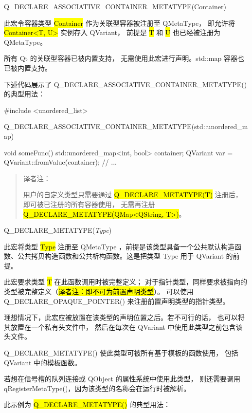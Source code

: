 Q\_DECLARE\_ASSOCIATIVE\_CONTAINER\_METATYPE(Container)

此宏令容器类型 \hl{Container} 作为关联型容器被注册至 QMetaType，
即允许将 \hl{Container<T, U>} 实例存入 QVariant，
前提是 \hl{T} 和 \hl{U} 也已经被注册为 QMetaType。

\begin{warning}
所有 Qt 的关联型容器已被内置支持，
无需使用此宏进行声明。std::map 容器也已被内置支持。
\end{warning}

下述代码展示了 Q\_DECLARE\_ASSOCIATIVE\_CONTAINER\_METATYPE() 的典型用法：

\begin{cppcode}
#include <unordered_list>

Q_DECLARE_ASSOCIATIVE_CONTAINER_METATYPE(std::unordered_map)

void someFunc()
{
    std::unordered_map<int, bool> container;
    QVariant var = QVariant::fromValue(container);
    // ...
}
\end{cppcode}

\begin{quote}
译者注：

用户的自定义类型只需要通过 \hl{Q\_DECLARE\_METATYPE(T)} 注册后，
即可被已注册的所有容器使用，
无需再注册 \hl{Q\_DECLARE\_METATYPE(QMap<QString, T>)}。
\end{quote}

Q\_DECLARE\_METATYPE(\emph{Type})

此宏将类型 \hl{Type} 注册至 QMetaType ，前提是该类型具备一个公共默认构造函数、公共拷贝构造函数和公共析构函数。这是把类型 Type 用于 QVariant 的前提。

此宏要求类型 \hl{T} 在此函数调用时被完整定义；
对于指针类型，同样要求被指向的类型被完整定义（\hl{译者注：即不可为前置声明类型}）。
可以使用 Q\_DECLARE\_OPAQUE\_POINTER() 来注册前置声明类型的指针类型。

理想情况下，此宏应被放置在该类型的声明位置之后。若不可行的话，
也可以将其放置在一个私有头文件中，
然后在每次在 QVariant 中使用此类型之前包含该头文件。

Q\_DECLARE\_METATYPE() 使此类型可被所有基于模板的函数使用，
包括 QVariant 中的模板函数。

\begin{notice}
若想在信号槽的队列连接或 QObject 的属性系统中使用此类型，
则还需要调用 qRegisterMetaType()，因为该类型的名称会在运行时被解析。
\end{notice}

此示例为 \hl{Q\_DECLARE\_METATYPE()} 的典型用法：

